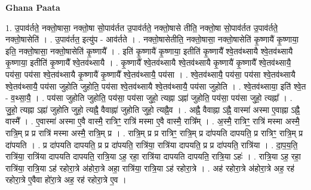 \documentclass[17pt]{extarticle}
\begin{document}
\textbf{Ghana Paata } \newline

1. उ॒पाव॑र्तते॒ नक्तो॒षासा॒ नक्तो॒षा सो॒पाव॑र्तत उ॒पाव॑र्तते॒ नक्तो॒षासे तीति॒ नक्तो॒षा सो॒पाव॑र्तत उ॒पाव॑र्तते॒ नक्तो॒षासेति॑ । . उ॒पाव॑र्तत॒ इत्यु॑प - आव॑र्तते । . नक्तो॒षासेतीति॒ नक्तो॒षासा॒ नक्तो॒षासेति॑ कृ॒ष्णायै॑ कृ॒ष्णाया॒ इति॒ नक्तो॒षासा॒ नक्तो॒षासेति॑ कृ॒ष्णायै᳚ । . इति॑ कृ॒ष्णायै॑ कृ॒ष्णाया॒ इतीति॑ कृ॒ष्णायै᳚ श्वे॒तव॑थ्सायै श्वे॒तव॑थ्सायै कृ॒ष्णाया॒ इतीति॑ 
कृ॒ष्णायै᳚ श्वे॒तव॑थ्सायै । . कृ॒ष्णायै᳚ श्वे॒तव॑थ्सायै श्वे॒तव॑थ्सायै कृ॒ष्णायै॑ कृ॒ष्णायै᳚ श्वे॒तव॑थ्सायै॒ पय॑सा॒ पय॑सा श्वे॒तव॑थ्सायै कृ॒ष्णायै॑ कृ॒ष्णायै᳚ श्वे॒तव॑थ्सायै॒ पय॑सा । . श्वे॒तव॑थ्सायै॒ पय॑सा॒ पय॑सा श्वे॒तव॑थ्सायै श्वे॒तव॑थ्सायै॒ पय॑सा जुहोति जुहोति॒ पय॑सा श्वे॒तव॑थ्सायै श्वे॒तव॑थ्सायै॒ पय॑सा जुहोति । . श्वे॒तव॑थ्साया॒ इति॑ श्वे॒त - व॒थ्सा॒यै॒ । . पय॑सा जुहोति जुहोति॒ पय॑सा॒ पय॑सा जुहो॒ त्यह्ना ऽह्ना॑ जुहोति॒ पय॑सा॒ पय॑सा जुहो॒ त्यह्ना᳚ । . जु॒हो॒ त्यह्ना ऽह्ना॑ जुहोति जुहो॒ त्यह्नै॒ वैवाह्ना॑ जुहोति जुहो॒ त्यह्नै॒व । . अह्नै॒ वैवाह्ना ऽह्नै॒ वास्मा॑ अस्मा ए॒वाह्ना ऽह्नै॒ वास्मै᳚ । . ए॒वास्मा॑ अस्मा ए॒वै वास्मै॒ रात्रिꣳ॒॒ रात्रि॑ मस्मा ए॒वै वास्मै॒ रात्रि᳚म् । . अ॒स्मै॒ रात्रिꣳ॒॒ रात्रि॑ मस्मा अस्मै॒ रात्रि॒म् प्र प्र रात्रि॑ मस्मा अस्मै॒ रात्रि॒म् प्र । . रात्रि॒म् प्र प्र रात्रिꣳ॒॒ रात्रि॒म् प्र दा॑पयति दापयति॒ प्र रात्रिꣳ॒॒ रात्रि॒म् प्र दा॑पयति । . प्र दा॑पयति दापयति॒ प्र प्र दा॑पयति॒ रात्रि॑या॒ रात्रि॑या दापयति॒ प्र प्र दा॑पयति॒ रात्रि॑या । . दा॒प॒य॒ति॒ रात्रि॑या॒ रात्रि॑या दापयति दापयति॒ रात्रि॒या ऽह॒ रहा॒ रात्रि॑या दापयति दापयति॒ रात्रि॒या ऽहः॑ । . रात्रि॒या ऽह॒ रहा॒ रात्रि॑या॒ रात्रि॒या ऽह॑ रहोरा॒त्रे अ॑होरा॒त्रे अहा॒ रात्रि॑या॒ रात्रि॒या ऽह॑ रहोरा॒त्रे । . अह॑ रहोरा॒त्रे अ॑होरा॒त्रे अह॒ रह॑ रहोरा॒त्रे ए॒वैवा हो॑रा॒त्रे अह॒ रह॑ रहोरा॒त्रे ए॒व । \newline
\end{document}
